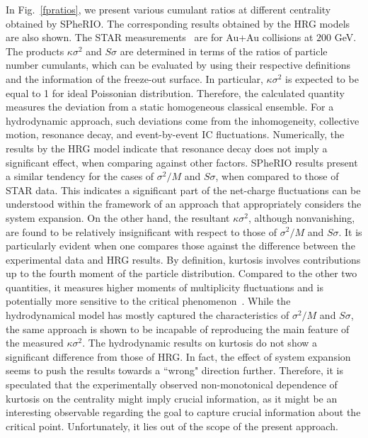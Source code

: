 \documentclass[secnumarabic, graphics,floatfix, nofootinbib,tightenlines,nobibnotes, aps, prl, 12pt]{revtex4-1}
\begin{document}
In Fig.~\ref{fpratios}, we present various cumulant ratios at different centrality obtained by SPheRIO.
The corresponding results obtained by the HRG models are also shown.
The STAR measurements~\cite{RHIC-star-mul-fluctuations-02} are for Au+Au collisions at $200$ GeV.
The products $\kappa\sigma^2$ and $S\sigma$ are determined in terms of the ratios of particle number cumulants, which can be evaluated by using their respective definitions and the information of the freeze-out surface.
In particular, $\kappa\sigma^2$ is expected to be equal to 1 for ideal Poissonian distribution.
Therefore, the calculated quantity measures the deviation from a static homogeneous classical ensemble.
For a hydrodynamic approach, such deviations come from the inhomogeneity, collective motion, resonance decay, and event-by-event IC fluctuations. 
Numerically, the results by the HRG model indicate that resonance decay does not imply a significant effect, when comparing against other factors.
SPheRIO results present a similar tendency for the cases of $\sigma^2/M$ and $S\sigma$, when compared to those of STAR data.
This indicates a significant part of the net-charge fluctuations can be understood within the framework of an approach that appropriately considers the system expansion.
On the other hand, the resultant $\kappa\sigma^2$, although nonvanishing, are found to be relatively insignificant with respect to those of $\sigma^2/M$ and $S\sigma$.
It is particularly evident when one compares those against the difference between the experimental data and HRG results.
By definition, kurtosis involves contributions up to the fourth moment of the particle distribution.
Compared to the other two quantities, it measures higher moments of multiplicity fluctuations and is potentially more sensitive to the critical phenomenon~\cite{qcd-phase-fluctuations-02,qcd-phase-fluctuations-03}.
While the hydrodynamical model has mostly captured the characteristics of $\sigma^2/M$ and $S\sigma$, the same approach is shown to be incapable of reproducing the main feature of the measured $\kappa\sigma^2$.
The hydrodynamic results on kurtosis do not show a significant difference from those of HRG.
In fact, the effect of system expansion seems to push the results towards a ``wrong" direction further.
Therefore, it is speculated that the experimentally observed non-monotonical dependence of kurtosis on the centrality might imply crucial information, as it might be an interesting observable regarding the goal to capture crucial information about the critical point.
Unfortunately, it lies out of the scope of the present approach.
\end{document}
